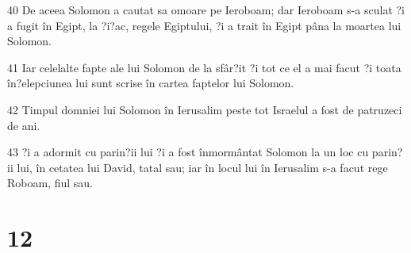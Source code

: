 \par 40 De aceea Solomon a cautat sa omoare pe Ieroboam; dar Ieroboam s-a sculat ?i a fugit în Egipt, la ?i?ac, regele Egiptului, ?i a trait în Egipt pâna la moartea lui Solomon.
\par 41 Iar celelalte fapte ale lui Solomon de la sfâr?it ?i tot ce el a mai facut ?i toata în?elepciunea lui sunt scrise în cartea faptelor lui Solomon.
\par 42 Timpul domniei lui Solomon în Ierusalim peste tot Israelul a fost de patruzeci de ani.
\par 43 ?i a adormit cu parin?ii lui ?i a fost înmormântat Solomon la un loc cu parin?ii lui, în cetatea lui David, tatal sau; iar în locul lui în Ierusalim s-a facut rege Roboam, fiul sau.

\chapter{12}


